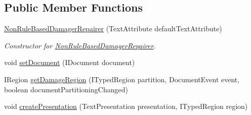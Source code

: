 \subsection*{Public Member Functions}
\begin{DoxyCompactItemize}
\item 
\mbox{\label{classcom_1_1fware_1_1cspdt_1_1cspm_1_1editor_1_1config_1_1_non_rule_based_damager_repairer_af36e6a07ac9c5ed46856284f25b72811}} 
\hyperlink{classcom_1_1fware_1_1cspdt_1_1cspm_1_1editor_1_1config_1_1_non_rule_based_damager_repairer_af36e6a07ac9c5ed46856284f25b72811}{Non\+Rule\+Based\+Damager\+Repairer} (Text\+Attribute default\+Text\+Attribute)
\begin{DoxyCompactList}\small\item\em Constructor for \hyperlink{classcom_1_1fware_1_1cspdt_1_1cspm_1_1editor_1_1config_1_1_non_rule_based_damager_repairer}{Non\+Rule\+Based\+Damager\+Repairer}. \end{DoxyCompactList}\item 
void \hyperlink{classcom_1_1fware_1_1cspdt_1_1cspm_1_1editor_1_1config_1_1_non_rule_based_damager_repairer_ae8015f432b2c8182cc3f981999a0874a}{set\+Document} (I\+Document document)
\item 
I\+Region \hyperlink{classcom_1_1fware_1_1cspdt_1_1cspm_1_1editor_1_1config_1_1_non_rule_based_damager_repairer_a6916df3bc6d3838ac23b4bdc7ab3799c}{get\+Damage\+Region} (I\+Typed\+Region partition, Document\+Event event, boolean document\+Partitioning\+Changed)
\item 
void \hyperlink{classcom_1_1fware_1_1cspdt_1_1cspm_1_1editor_1_1config_1_1_non_rule_based_damager_repairer_a502091b5e822b3d552cb1a3fad459d8b}{create\+Presentation} (Text\+Presentation presentation, I\+Typed\+Region region)
\end{DoxyCompactItemize}
